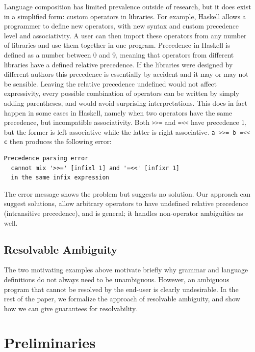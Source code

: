 \documentclass[runningheads]{llncs}
\newcommand{\haskell}{\lstinline[language=haskell]}
\begin{document}
Language composition has limited prevalence outside of research, but it does exist in a simplified form: custom operators in libraries. For example, Haskell allows a programmer to define new operators, with new syntax and custom precedence level and associativity. A user can then import these operators from any number of libraries and use them together in one program. Precedence in Haskell is defined as a number between 0 and 9, meaning that operators from different libraries have a defined relative precedence. If the libraries were designed by different authors this precedence is essentially by accident and it may or may not be sensible. Leaving the relative precedence undefined would not affect expressivity, every possible combination of operators can be written by simply adding parentheses, and would avoid surprising interpretations. This does in fact happen in some cases in Haskell, namely when two operators have the same precedence, but incompatible associativity. Both \haskell{>>=} and \haskell{=<<} have precedence 1, but the former is left associative while the latter is right associative. \haskell{a >>= b =<< c} then produces the following error:

\begin{lstlisting}
Precedence parsing error
  cannot mix '>>=' [infixl 1] and '=<<' [infixr 1]
  in the same infix expression
\end{lstlisting}

\noindent The error message shows the problem but suggests no solution. Our approach can suggest solutions, allow arbitrary operators to have undefined relative precedence (intransitive precedence), and is general; it handles non-operator ambiguities as well.

\subsection{Resolvable Ambiguity}
The two motivating examples above motivate briefly why grammar
and language definitions do not always need to be unambiguous. However, an
ambiguous program that cannot be resolved by the end-user is clearly
undesirable. In the rest of the paper, we formalize the approach of
resolvable ambiguity, and show how we can give guarantees for
resolvability.




\section{Preliminaries}
\label{sec:prel}
\end{document}
